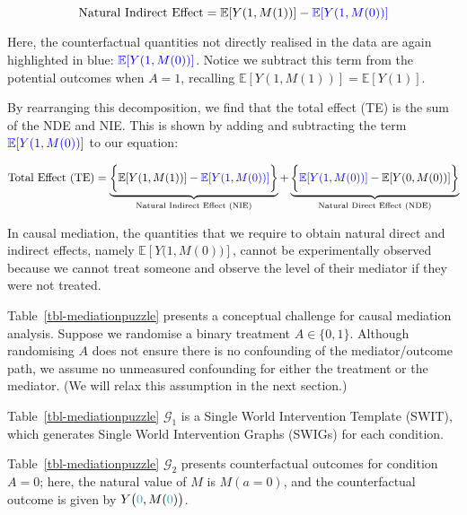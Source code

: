 \documentclass[
  single column]{article}
\begin{document}
\[
\text{Natural Indirect Effect} = \mathbb{E}[Y(1, M(1))] - \textcolor{blue}{\mathbb{E}[Y(1, M(0))]}
\]

Here, the counterfactual quantities not directly realised in the data
are again highlighted in blue:
\(\textcolor{blue}{\mathbb{E}[Y(1, M(0))]}\). Notice we subtract this
term from the potential outcomes when \(A = 1\), recalling
\(\mathbb{E}[Y(1, M(1))] = \mathbb{E}[Y(1)]\).

By rearranging this decomposition, we find that the total effect (TE) is
the sum of the NDE and NIE. This is shown by adding and subtracting the
term \(\textcolor{blue}{\mathbb{E}[Y(1, M(0))]}\) to our equation:

\[
\text{Total Effect (TE)} = \underbrace{\bigg\{\mathbb{E}[Y(1, M(1))] - \textcolor{blue}{\mathbb{E}[Y(1, M(0))]}\bigg\}}_{\text{Natural Indirect Effect (NIE)}} + \underbrace{\bigg\{\textcolor{blue}{\mathbb{E}[Y(1, M(0))]} - \mathbb{E}[Y(0, M(0))]\bigg\}}_{\text{Natural Direct Effect (NDE)}}
\]

\begin{table}

\caption{\label{tbl-mediationpuzzle}In causal mediation, the quantities
that we require to obtain natural direct and indirect effects, namely
\(\mathbb{E}[Y\big(1,M(0)\big)]\), cannot be experimentally observed
because we cannot treat someone and observe the level of their mediator
if they were not treated.}

\centering{

\mediationpuzzle

}

\end{table}%

Table~\ref{tbl-mediationpuzzle} presents a conceptual challenge for
causal mediation analysis. Suppose we randomise a binary treatment
\(A \in \{0,1\}\). Although randomising \(A\) does not ensure there is
no confounding of the mediator/outcome path, we assume no unmeasured
confounding for either the treatment or the mediator. (We will relax
this assumption in the next section.)

Table~\ref{tbl-mediationpuzzle} \(\mathcal{G}_1\) is a Single World
Intervention Template (SWIT), which generates Single World Intervention
Graphs (SWIGs) for each condition.

Table~\ref{tbl-mediationpuzzle} \(\mathcal{G}_2\) presents
counterfactual outcomes for condition \(A = 0\); here, the natural value
of \(M\) is \(M(a = 0)\), and the counterfactual outcome is given by
\(Y\big(\textcolor{cyan}{0}, M(\textcolor{cyan}{0})\big)\).
\end{document}
